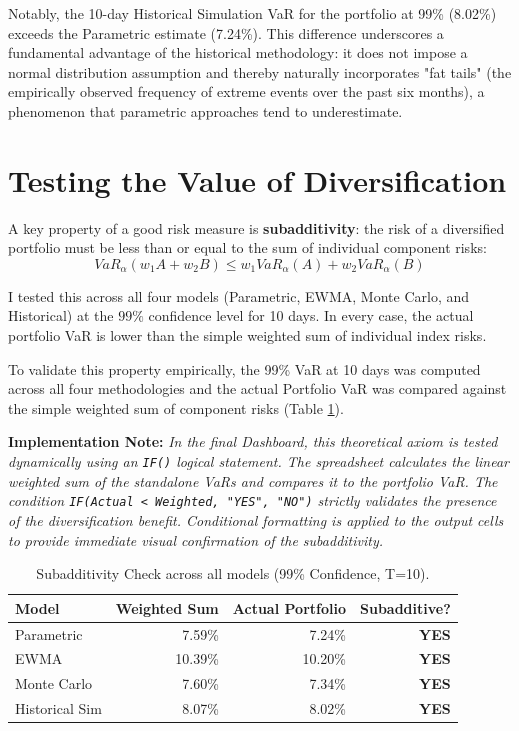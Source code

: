 \documentclass{report}
\begin{document}
Notably, the 10-day Historical Simulation VaR for the portfolio at 99\% (8.02\%) exceeds the Parametric estimate (7.24\%). This difference underscores a fundamental advantage of the historical methodology: it does not impose a normal distribution assumption and thereby naturally incorporates "fat tails" (the empirically observed frequency of extreme events over the past six months), a phenomenon that parametric approaches tend to underestimate.

\section{Testing the Value of Diversification}
A key property of a good risk measure is \textbf{subadditivity}: the risk of a diversified portfolio must be less than or equal to the sum of individual component risks:
\[ VaR_{\alpha}(w_1 A + w_2 B) \le w_1 VaR_{\alpha}(A) + w_2 VaR_{\alpha}(B) \]

I tested this across all four models (Parametric, EWMA, Monte Carlo, and Historical) at the $99\%$ confidence level for 10 days. In every case, the actual portfolio VaR is lower than the simple weighted sum of individual index risks.

To validate this property empirically, the 99\% VaR at 10 days was computed across all four methodologies and the actual Portfolio VaR was compared against the simple weighted sum of component risks (Table \ref{tab:subadditivity}).

\textbf{Implementation Note:} \textit{In the final Dashboard, this theoretical axiom is tested dynamically using an \texttt{IF()} logical statement. The spreadsheet calculates the linear weighted sum of the standalone VaRs and compares it to the portfolio VaR. The condition \texttt{IF(Actual < Weighted, "YES", "NO")} strictly validates the presence of the diversification benefit. Conditional formatting is applied to the output cells to provide immediate visual confirmation of the subadditivity.}

\begin{table}[H]
    \centering
    \begin{tabular}{lrrr}
        \toprule
        \textbf{Model} & \textbf{Weighted Sum} & \textbf{Actual Portfolio} & \textbf{Subadditive?} \\
        \midrule
        Parametric & 7.59\% & 7.24\% & \textcolor{green!60!black}{\textbf{YES}} \\
        EWMA & 10.39\% & 10.20\% & \textcolor{green!60!black}{\textbf{YES}} \\
        Monte Carlo & 7.60\% & 7.34\% & \textcolor{green!60!black}{\textbf{YES}} \\
        Historical Sim & 8.07\% & 8.02\% & \textcolor{green!60!black}{\textbf{YES}} \\
        \bottomrule
    \end{tabular}
    \caption{Subadditivity Check across all models (99\% Confidence, T=10).}
    \label{tab:subadditivity}
\end{table}
\end{document}
